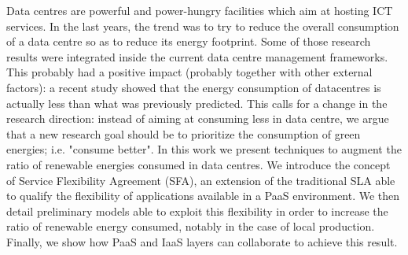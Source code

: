 
Data centres are powerful and power-hungry facilities which aim at hosting ICT services.
In the last years, the trend was to try to reduce the overall consumption of a data centre so as to reduce its energy footprint.
Some of those research results were integrated inside the current data centre management frameworks.
This probably had a positive impact (probably together with other external factors): a recent study showed that the energy consumption of datacentres is actually less than what was previously predicted.
This calls for a change in the research direction: instead of aiming at consuming less in data centre, we argue that a new research goal should be to prioritize the consumption of green energies; i.e. "consume better".
In this work we present techniques to augment the ratio of renewable energies consumed in data centres.
We introduce the concept of Service Flexibility Agreement (SFA), an extension of the traditional SLA able to qualify the flexibility of applications available in a PaaS environment.
We then detail preliminary models able to exploit this flexibility in order to increase the ratio of renewable energy consumed, notably in the case of local production.
Finally, we show how PaaS and IaaS layers can collaborate to achieve this result.
